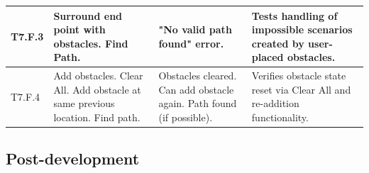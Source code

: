 \begin{longtable}{|p{}|p{}|p{}|p{}|}
	\hline
	T7.F.3 & Surround end point with obstacles. Find Path. & "No valid path found" error. & Tests handling of impossible scenarios created by user-placed obstacles. \\
	\hline
	T7.F.4 & Add obstacles. Clear All. Add obstacle at same previous location. Find path. & Obstacles cleared. Can add obstacle again. Path found (if possible). & Verifies obstacle state reset via Clear All and re-addition functionality. \\
	\hline
\end{longtable}

\newpage

\subsection{Post-development}

